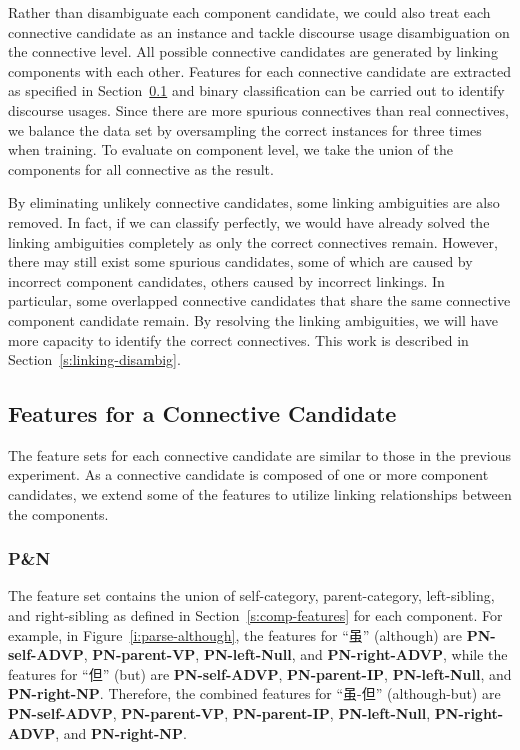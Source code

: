 Rather than disambiguate each component candidate, we could also treat each connective
candidate as an instance and tackle discourse usage disambiguation on the connective
level. All possible connective candidates are  generated by linking components with
each other. Features for each connective candidate are extracted as specified in
Section~\ref{s:connective-features} and binary
classification can be carried out to identify discourse usages.
Since there are more spurious connectives than real connectives, we balance the
data set by oversampling the correct instances for three times when training. To evaluate on
component level, we take the union of the components for all connective as the result.

By eliminating unlikely connective candidates, some linking ambiguities 
are also removed. In fact, if we can classify perfectly, we would have already
solved the linking ambiguities completely as only the correct connectives remain.
However, there may still exist some spurious candidates, some of which are
caused by incorrect component candidates, others caused by
incorrect linkings.
In particular, some overlapped connective candidates that share the same
connective component candidate remain. By resolving the linking
ambiguities, we will have more capacity to identify the correct connectives. This
work is described in Section~\ref{s:linking-disambig}.

\subsection{Features for a Connective Candidate}
\label{s:connective-features}

The feature sets for each connective candidate are similar to those in the previous
experiment. As a connective candidate is composed of one or more component candidates,
we extend some of the features to utilize linking relationships between the
components.

\subsubsection{P\&N}

The feature set contains the union of self-category, parent-category, left-sibling,
and right-sibling as defined in Section~\ref{s:comp-features} for each component.
For example, in Figure~\ref{i:parse-although}, the features for ``虽'' (although) are
\textbf{PN-self-ADVP}, \textbf{PN-parent-VP}, \textbf{PN-left-Null}, and \textbf{PN-right-ADVP}, while
the features for ``但'' (but) are \textbf{PN-self-ADVP}, \textbf{PN-parent-IP}, \textbf{PN-left-Null},
and \textbf{PN-right-NP}. Therefore, the combined features for ``虽-但'' (although-but) are
\textbf{PN-self-ADVP}, \textbf{PN-parent-VP}, \textbf{PN-parent-IP}, \textbf{PN-left-Null},
\textbf{PN-right-ADVP}, and \textbf{PN-right-NP}.



